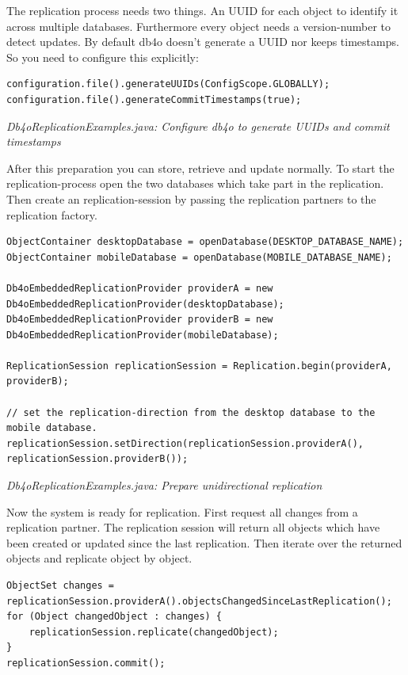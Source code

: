 The replication process needs two things. An UUID for each object to identify it across multiple databases. Furthermore every object needs a version-number to detect updates. By default db4o doesn't generate a UUID nor keeps timestamps. So you need to configure this explicitly:

\begin{lstlisting}
configuration.file().generateUUIDs(ConfigScope.GLOBALLY);
configuration.file().generateCommitTimestamps(true);
\end{lstlisting}

{\small\itshape Db4oReplicationExamples.java: Configure db4o to generate UUIDs and commit timestamps\par}
\medskip

After this preparation you can store, retrieve and update normally. To start the replication-process open the two databases which take part in the replication. Then create an replication-session by passing the replication partners to the replication factory.

\begin{lstlisting}
ObjectContainer desktopDatabase = openDatabase(DESKTOP_DATABASE_NAME);
ObjectContainer mobileDatabase = openDatabase(MOBILE_DATABASE_NAME);

Db4oEmbeddedReplicationProvider providerA = new Db4oEmbeddedReplicationProvider(desktopDatabase);
Db4oEmbeddedReplicationProvider providerB = new Db4oEmbeddedReplicationProvider(mobileDatabase);

ReplicationSession replicationSession = Replication.begin(providerA, providerB);

// set the replication-direction from the desktop database to the mobile database. 
replicationSession.setDirection(replicationSession.providerA(), replicationSession.providerB());
\end{lstlisting}

{\small\itshape Db4oReplicationExamples.java: Prepare unidirectional replication\par}
\medskip

Now the system is ready for replication. First request all changes from a replication partner. The replication session will return all objects which have been created or updated since the last replication. Then iterate over the returned objects and replicate object by object.

\begin{lstlisting}
ObjectSet changes = replicationSession.providerA().objectsChangedSinceLastReplication();
for (Object changedObject : changes) { 
    replicationSession.replicate(changedObject);
}
replicationSession.commit();
\end{lstlisting}

